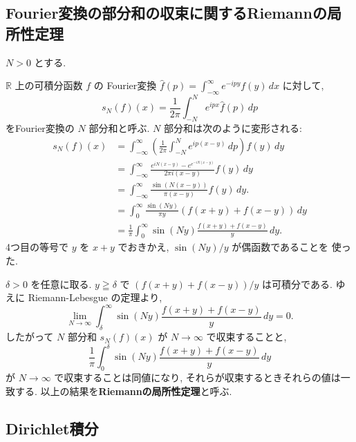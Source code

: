 \documentclass[12pt,twoside]{jarticle}
\newcommand\R{{\mathbb R}} %
\theoremstyle{jplain}
\theoremstyle{jplain}
\theoremstyle{jplain}
\numberwithin{theorem}{section}
\numberwithin{equation}{section}
\numberwithin{figure}{section}
\numberwithin{table}{section}
\begin{document}
\subsection{Fourier変換の部分和の収束に関するRiemannの局所性定理}
\label{sec:Ftransf-N}

$N>0$ とする.

$\R$ 上の可積分函数 $f$ の
Fourier変換 $\widehat{f}(p)=\int_{-\infty}^\infty e^{-ipy}f(y)\,dx$ に対して,
\[
s_N(f)(x) = \frac{1}{2\pi}\int_{-N}^N e^{ipx} \widehat{f}(p)\,dp
\]
をFourier変換の $N$ 部分和と呼ぶ. $N$ 部分和は次のように変形される:
\begin{align*}
s_N(f)(x)
&=\int_{-\infty}^\infty
\left(\frac{1}{2\pi}\int_{-N}^N e^{ip(x-y)} \,dp\right) f(y)\,dy
\\ &
=\int_{-\infty}^\infty
\frac{e^{iN(x-y)}-e^{e^{-iN(x-y)}}}{2\pi i(x-y)} f(y)\,dy
\\ &
=\int_{-\infty}^\infty
\frac{\sin(N(x-y))}{\pi(x-y)} f(y)\,dy.
\\ &
=\int_0^\infty
\frac{\sin(Ny)}{\pi y} (f(x+y)+f(x-y))\,dy
\\ &
=\frac{1}{\pi}\int_0^\infty
\sin(Ny) \frac{f(x+y)+f(x-y)}{y} \,dy.
\end{align*}
4つ目の等号で $y$ を $x+y$ でおきかえ, $\sin(Ny)/y$ が偶函数であることを
使った.

$\delta>0$ を任意に取る.
$y\geqq \delta$ で $(f(x+y)+f(x-y))/y$ は可積分である.
ゆえに Riemann-Lebesgue の定理より,
\[
\lim_{N\to\infty}
\int_\delta^\infty
\sin(Ny) \frac{f(x+y)+f(x-y)}{y} \,dy
= 0.
\]
したがって $N$ 部分和 $s_N(f)(x)$ が $N\to\infty$ で収束することと,
\[
\frac{1}{\pi}\int_0^\delta
\sin(Ny) \frac{f(x+y)+f(x-y)}{y} \,dy
\]
が $N\to\infty$ で収束することは同値になり,
それらが収束するときそれらの値は一致する.
以上の結果を{\bfseries Riemannの局所性定理}と呼ぶ.



\subsection{Dirichlet積分}
\label{sec:Dirichlet-integral}
\end{document}
